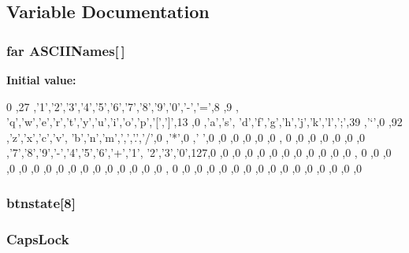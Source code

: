 \subsection{Variable Documentation}
\hypertarget{ID__IN_8C_a6c22c136da745810946d3aac69888876}{
\subsubsection[{ASCIINames}]{ far {\bf ASCIINames}\mbox{[}$\,$\mbox{]}}}
\label{ID__IN_8C_a6c22c136da745810946d3aac69888876}
{\bfseries Initial value:}
\begin{DoxyCode}
                
                                        {

        0  ,27 ,'1','2','3','4','5','6','7','8','9','0','-','=',8  ,9  ,        
        'q','w','e','r','t','y','u','i','o','p','[',']',13 ,0  ,'a','s',        
        'd','f','g','h','j','k','l',';',39 ,'`',0  ,92 ,'z','x','c','v',        
        'b','n','m',',','.','/',0  ,'*',0  ,' ',0  ,0  ,0  ,0  ,0  ,0  ,        
        0  ,0  ,0  ,0  ,0  ,0  ,0  ,'7','8','9','-','4','5','6','+','1',        
        '2','3','0',127,0  ,0  ,0  ,0  ,0  ,0  ,0  ,0  ,0  ,0  ,0  ,0  ,        
        0  ,0  ,0  ,0  ,0  ,0  ,0  ,0  ,0  ,0  ,0  ,0  ,0  ,0  ,0  ,0  ,        
        0  ,0  ,0  ,0  ,0  ,0  ,0  ,0  ,0  ,0  ,0  ,0  ,0  ,0  ,0  ,0           
                                        }
\end{DoxyCode}
\hypertarget{ID__IN_8C_aa849c3f42c509da54c3639fc864af75c}{
\subsubsection[{btnstate}]{ {\bf btnstate}\mbox{[}8\mbox{]}}}
\label{ID__IN_8C_aa849c3f42c509da54c3639fc864af75c}
\hypertarget{ID__IN_8C_a5209de370ef200e743baca833db3ea30}{
\subsubsection[{CapsLock}]{ {\bf CapsLock}}}
